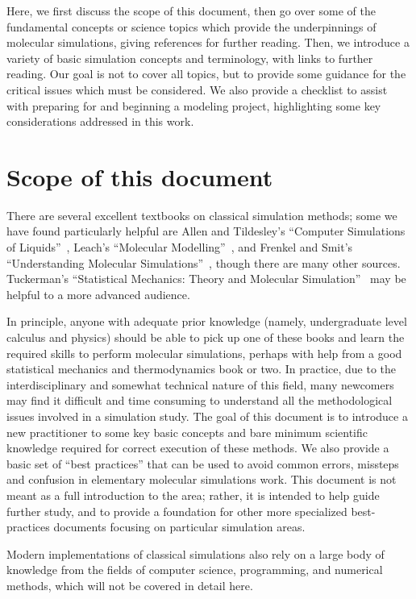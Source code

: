 \documentclass[9pt,bestpractices]{livecoms}
\begin{document}
Here, we first discuss the scope of this document, then go over some of the fundamental concepts or science topics which provide the underpinnings of molecular simulations, giving references for further reading.
Then, we introduce a variety of basic simulation concepts and terminology, with links to further reading.
Our goal is not to cover all topics, but to provide some guidance for the critical issues which must be considered.
We also provide a checklist to assist with preparing for and beginning a modeling project, highlighting some key considerations addressed in this work.

\section{Scope of this document}
\label{sec:scope}

There are several excellent textbooks on classical simulation methods; some we have found particularly helpful are Allen and Tildesley's ``Computer Simulations of Liquids''~\cite{allen_computer_2017}, Leach's ``Molecular Modelling''~\cite{LeachBook}, and Frenkel and Smit's ``Understanding Molecular Simulations''~\cite{Frenkel:2001:}, though there are many other sources.
Tuckerman's ``Statistical Mechanics: Theory and Molecular Simulation''~\cite{Tuckerman:2010:} may be helpful to a more advanced audience.

In principle, anyone with adequate prior knowledge (namely, undergraduate level calculus and physics) should be able to pick up one of these books and learn the required skills to perform molecular simulations, perhaps with help from a good statistical mechanics and thermodynamics book or two.
In practice, due to the interdisciplinary and somewhat technical nature of this field, many newcomers may find it difficult and time consuming to understand all the methodological issues involved in a simulation study.
The goal of this document is to introduce a new practitioner to some key basic concepts and bare minimum scientific knowledge required for correct execution of these methods.
We also provide a basic set of ``best practices'' that can be used to avoid common errors, missteps and confusion in elementary molecular simulations work.
This document is not meant as a full introduction to the area; rather, it is intended to help guide further study, and to provide a foundation for other more specialized best-practices documents focusing on particular simulation areas.

Modern implementations of classical simulations also rely on a large body of knowledge from the fields of computer science, programming, and numerical methods, which will not be covered in detail here.
\end{document}
